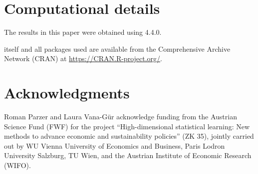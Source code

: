 \documentclass[
  article]{jss}
\begin{document}
\section*{Computational details}\label{computational-details}

The results in this paper were obtained using  4.4.0.

 itself and all packages used are available from the
Comprehensive  Archive Network (CRAN) at
\url{https://CRAN.R-project.org/}.

\section*{Acknowledgments}\label{acknowledgments}

Roman Parzer and Laura Vana-Gür acknowledge funding from the Austrian
Science Fund (FWF) for the project ``High-dimensional statistical
learning: New methods to advance economic and sustainability policies''
(ZK 35), jointly carried out by WU Vienna University of Economics and
Business, Paris Lodron University Salzburg, TU Wien, and the Austrian
Institute of Economic Research (WIFO).


\renewcommand\refname{References}
  
\end{document}
